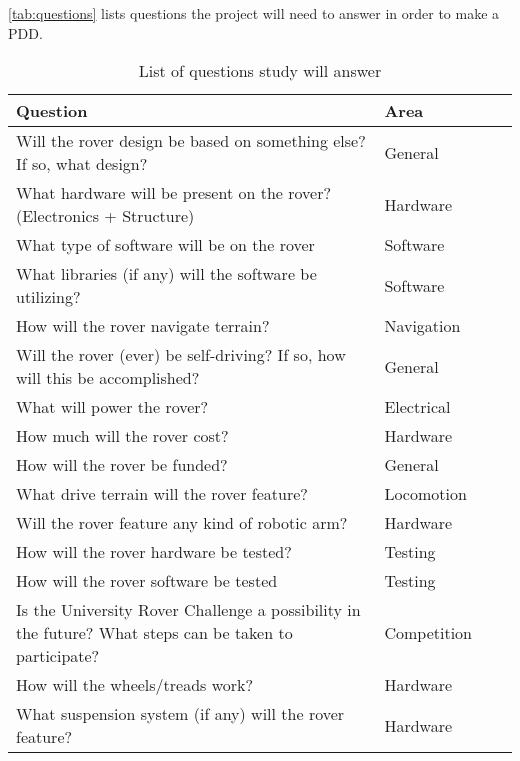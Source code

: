 \documentclass[conference]{IEEEtran} %
\begin{document}
\autoref{tab:questions} lists questions the project will need to answer in order to make a PDD.

\begin{table*}
    \caption{List of questions study will answer}
    \centering
    \begin{tabular}{@{}llcc@{}}
        \toprule %
        Question & Area \\
        \midrule %
        Will the rover design be based on something else? If so, what design? & General \\
        What hardware will be present on the rover? (Electronics + Structure) & Hardware \\
        What type of software will be on the rover & Software \\
        What libraries (if any) will the software be utilizing? & Software \\ 
        How will the rover navigate terrain? & Navigation \\
        Will the rover (ever) be self-driving? If so, how will this be accomplished? & General \\
        What will power the rover? & Electrical \\
        How much will the rover cost? & Hardware \\
        How will the rover be funded? & General \\
        What drive terrain will the rover feature? & Locomotion \\
        Will the rover feature any kind of robotic arm? & Hardware \\
        How will the rover hardware be tested? & Testing \\
        How will the rover software be tested & Testing \\
        Is the University Rover Challenge a possibility in the future? What steps can be taken to participate? & Competition \\
        How will the wheels/treads work? & Hardware \\
        What suspension system (if any) will the rover feature? & Hardware \\

\end{tabular}
\end{table*}
\end{document}

